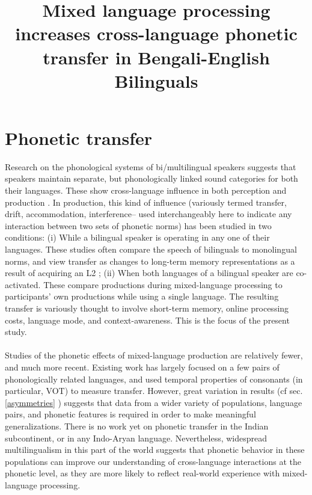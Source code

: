 \documentclass[11pt]{article}
\title{Mixed language processing increases cross-language phonetic transfer in Bengali-English Bilinguals}
\date{}
\begin{document}
	
	\maketitle
	
	

\section{Phonetic transfer}

 Research on the phonological systems of bi/multilingual speakers suggests that speakers maintain separate, but phonologically linked sound categories for both their languages. These show cross-language influence in both perception and production
. In production, this kind of influence (variously termed transfer, drift, accommodation, interference-- used interchangeably here to indicate any interaction between two sets of phonetic norms) has been studied in two conditions:
(i) While a bilingual speaker is operating in any one of their languages. These studies often compare the speech of bilinguals to monolingual norms, and view transfer as changes to long-term memory representations as a result of acquiring an L2 \cite{guion2003vowel,caramazza1973acquisition,flege1987production}; (ii) When both languages of a bilingual speaker are co-activated. These compare productions during mixed-language processing to participants' own productions while using a single language. The resulting transfer is variously thought to involve short-term memory, online processing costs, language mode, and context-awareness. This is the focus of the present study. 

\paragraph{ }Studies of the phonetic effects of mixed-language production are relatively fewer, and much more recent. Existing work has largely focused on a few pairs of phonologically related languages, and used temporal properties of consonants (in particular, VOT) to measure transfer. However, great variation in results (cf sec.\ref{asymmetries} ) suggests that data from a wider variety of populations, language pairs,  and phonetic features is required in order to make meaningful generalizations. There is no work yet on phonetic transfer in the Indian subcontinent, or in any Indo-Aryan language. Nevertheless, widespread multilingualism in this part of the world suggests that phonetic
 behavior in these populations can improve our understanding of cross-language interactions at the phonetic level, as they are more likely to reflect real-world experience with mixed-language processing.
\end{document}
